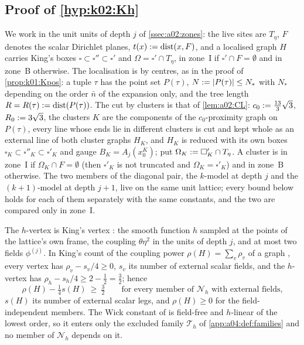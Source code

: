 
\subsection{Proof of \texorpdfstring{\cref{hyp:k02:Kh}}{the one-step convergence of the source-dependent graphs}}\label{ssec:k02:Khproof}

We work in the unit units of depth $j$ of \cref{ssec:a02:zones}: the live sites are $T_\eta$, $F$ denotes the scalar Dirichlet planes, $t(x):=\operatorname{dist}(x,F)$, and a localised graph $H$ carries King's boxes $\square\subset\square''\subset\square'$ and $\Omega=\square'\cap T_\eta$, in zone~I if $\square'\cap F=\emptyset$ and in zone~B otherwise. The localisation is by centres, as in the proof of \cref{prop:k01:Kpos}: a tuple $\tau$ has the point set $P(\tau)$, $N:=|P(\tau)|\le N_*$ with $N_*$ depending on the order $\bar n$ of the expansion only, and the tree length $R=R(\tau):=\operatorname{dist}(P(\tau))$. The cut by clusters is that of \cref{lem:a02:CL}: $c_0:=\frac{13}3\sqrt3$, $R_0:=3\sqrt3$, the clusters $K$ are the components of the $c_0$-proximity graph on $P(\tau)$, every line whose ends lie in different clusters is cut and kept whole as an external line of both cluster graphs $H_K$, and $H_K$ is reduced with its own boxes $\square_K\subset\square''_K\subset\square'_K$ and gauge $B_K=A_j(x^K_0)$; put $\Omega_K:=\square'_K\cap T_\eta$. A cluster is in zone~I if $\Omega_K\cap F=\emptyset$ (then $\square'_K$ is not truncated and $\Omega_K=\square'_K$) and in zone~B otherwise. The two members of the diagonal pair, the $k$-model at depth $j$ and the $(k+1)$-model at depth $j+1$, live on the same unit lattice; every bound below holds for each of them separately with the same constants, and the two are compared only in zone~I.

The $h$-vertex is King's vertex \cite[(3.21)]{K1}: the smooth function $h$ sampled at the points of the lattice's own frame, the coupling $\theta\eta^{2}$ in the units of depth $j$, and at most two fields $\phi^{(j)}$. In King's count of the coupling power $\rho(H)=\sum_v\rho_v$ of a graph \cite[p.~665]{K1}, every vertex has $\rho_v-s_v/4\ge0$, $s_v$ its number of external scalar fields, and the $h$-vertex has $\rho_h-s_h/4\ge2-\frac12=\frac32$; hence
\begin{equation}\label{eq:k02:margin}
\rho(H)-\tfrac14s(H)\ \ge\ \tfrac32\qquad\text{for every member of $\mathcal N_h$ with external fields,}
\end{equation}
$s(H)$ its number of external scalar legs, and $\rho(H)\ge0$ for the field-independent members. The Wick constant of \cite[(3.21)]{K1} is field-free and $h$-linear of the lowest order, so it enters only the excluded family $\mathcal T_h$ of \cref{app:a04:def:families} and no member of $\mathcal N_h$ depends on it.

